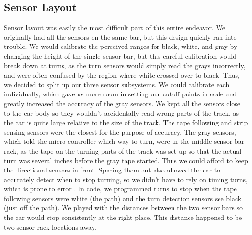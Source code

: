 \documentclass[12pt]{article}
\begin{document}
\subsection*{Sensor Layout}
Sensor layout was easily the most difficult part of this entire endeavor. We
originally had all the sensors on the same bar, but this design quickly ran into
trouble. We would calibrate the perceived ranges for black, white, and gray by
changing the height of the single sensor bar, but this careful calibration would
break down at turns, as the turn sensors would simply read the grays incorrectly,
and were often confused by the region where white crossed over to black. Thus, we
decided to split up our three sensor subsystems. We could calibrate each
individually, which gave us more room in setting our cutoff points in code and
greatly increased the accuracy of the gray sensors. We kept all the sensors close
to the car body so they wouldn't accidentally read wrong parts of the track, as the 
car is quite large relative to the size of the track. The tape following and
strip sensing sensors were the closest for the purpose of accuracy. The gray
sensors, which told the micro controller which way to turn, were in the middle
sensor bar rack, as the tape on the turning parts of the track was set up so that
the actual turn was several inches before the gray tape started. Thus we could afford to keep the directional sensors in front. Spacing them out also allowed
the car to accurately detect when to stop turning, so we didn't have to rely
on timing turns, which is prone to error
. In code, we programmed
turns to stop when the tape following sensors were white (the path) and the
turn detection sensors see black (just off the path). We played with the
distances between the two sensor bars so the car would stop consistently at the
right place. This distance happened to be two sensor rack locations away.
\end{document}
